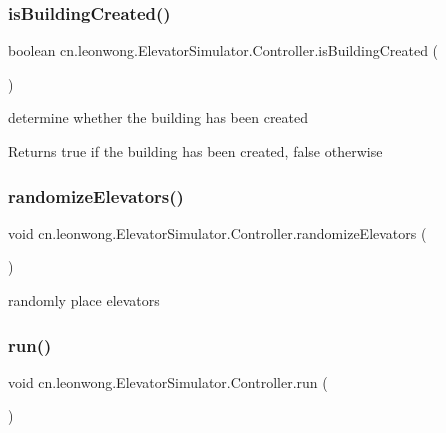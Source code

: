 \subsubsection{\texorpdfstring{is\+Building\+Created()}{isBuildingCreated()}}
{\footnotesize\ttfamily boolean cn.\+leonwong.\+Elevator\+Simulator.\+Controller.\+is\+Building\+Created (\begin{DoxyParamCaption}{ }\end{DoxyParamCaption})}

determine whether the building has been created \begin{DoxyReturn}{Returns}
true if the building has been created, false otherwise 
\end{DoxyReturn}
\mbox{\label{classcn_1_1leonwong_1_1_elevator_simulator_1_1_controller_a3fcedb04b31288434dfc312af5f4e32c}} 
\subsubsection{\texorpdfstring{randomize\+Elevators()}{randomizeElevators()}}
{\footnotesize\ttfamily void cn.\+leonwong.\+Elevator\+Simulator.\+Controller.\+randomize\+Elevators (\begin{DoxyParamCaption}{ }\end{DoxyParamCaption})}

randomly place elevators \mbox{\label{classcn_1_1leonwong_1_1_elevator_simulator_1_1_controller_ae83c14542e0003ed7d165e61d886732a}} 
\subsubsection{\texorpdfstring{run()}{run()}}
{\footnotesize\ttfamily void cn.\+leonwong.\+Elevator\+Simulator.\+Controller.\+run (\begin{DoxyParamCaption}{ }\end{DoxyParamCaption})}

